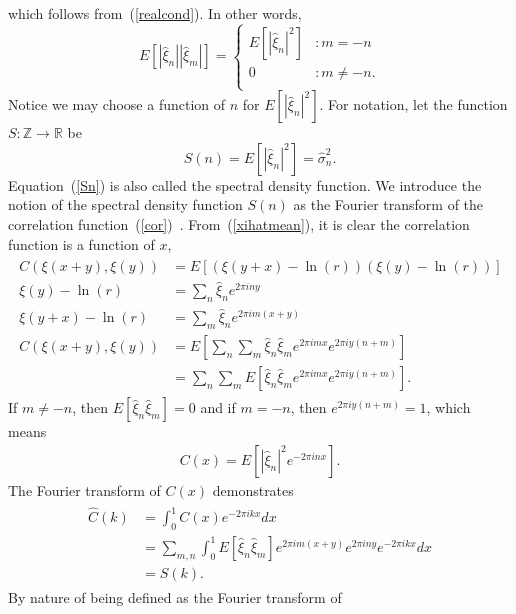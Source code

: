 which follows from~(\ref{realcond}). In other words,
\begin{displaymath}
E[|\hat{\xi}_n||\hat{\xi}_m|] = \left\{
     \begin{array}{lr}
       E[|\hat{\xi}_n|^2] & : m = -n\\
       0 & : m \neq -n.\\
     \end{array}
   \right.
\end{displaymath} 
Notice we may choose a function of $n$ for $E[|\hat{\xi}_n|^2]$. For notation, let the function $S:\mathbb{Z} \to \mathbb{R}$ be
\begin{equation}\label{Sn}
S(n) = E[|\hat{\xi}_n|^2] = \hat{\sigma}_n^2.
\end{equation}
Equation~(\ref{Sn}) is also called the spectral density function. We introduce the notion of the spectral density function $S(n)$ as the Fourier transform
of the correlation
function~(\ref{cor})~\cite{gelhar}. From~(\ref{xihatmean}), it is
clear the correlation function is a function of $x$,
\begin{align*}
\begin{split}
C(\xi(x+y),\xi(y)) &= E[(\xi(y+x) -\ln(r))(\xi(y)-\ln(r))]\\
\xi(y) - \ln(r) &= \sum_n\hat{\xi}_ne^{2\pi iny}\\
\xi(y+x) - \ln(r) &= \sum_m\hat{\xi}_ne^{2\pi im(x+y)}\\
C(\xi(x+y),\xi(y)) &= E\left[\sum_n\sum_m \hat{\xi}_n\hat{\xi}_m e^{2\pi
  imx}e^{2\pi iy(n+m)}\right]\\
&= \sum_n\sum_m E\left[\hat{\xi}_n\hat{\xi}_m e^{2\pi
  imx}e^{2\pi iy(n+m)}\right].
\end{split}
\end{align*}
If $m \neq -n$, then $E[\hat{\xi}_n\hat{\xi}_m]=0$ and if $m =-n$, then $e^{2\pi
  iy(n+m)}=1$, which means
\begin{align*}
C(x) = E[|\hat{\xi}_n|^2 e^{-2\pi inx}].
\end{align*}
The Fourier transform of $C(x)$ demonstrates
\begin{align*}
\begin{split}
\hat{C}(k) &= \int_{0}^{1}C(x)e^{-2\pi ikx}dx\\
&= \sum_{m,n} \int_{0}^{1} E[\hat{\xi}_n\hat{\xi}_m] e^{2\pi
  im(x+y)}e^{2\pi iny}e^{-2\pi ikx}dx\\
&=S(k).
\end{split}
\end{align*}
By nature of being defined as the Fourier transform of
